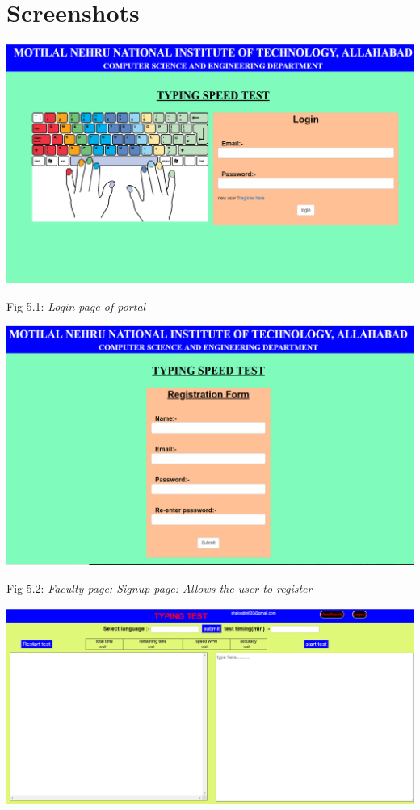 \documentclass{mnnit}
\begin{document}
\chapter{Screenshots}
\includegraphics[width=\textwidth]{images/1_userLogin.PNG}
\begin{center}
Fig 5.1: \emph{Login page of portal}
\end{center}
\includegraphics[width=\textwidth]{images/2_sinup.PNG}
\begin{center}
Fig 5.2: \emph{Faculty page: Signup page: Allows the user to register}
\end{center}
\includegraphics[width=\textwidth]{images/3_afterlogin.PNG}
\end{document}
